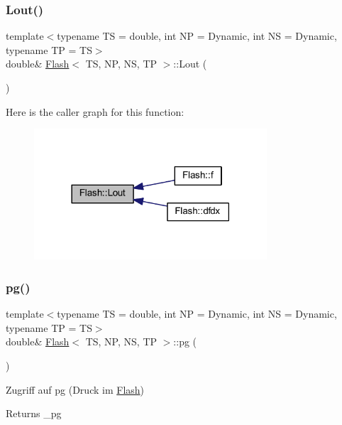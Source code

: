 \subsubsection{\texorpdfstring{Lout()}{Lout()}}
{\footnotesize\ttfamily template$<$typename TS = double, int NP = Dynamic, int NS = Dynamic, typename TP = TS$>$ \\
double\& \mbox{\hyperlink{class_flash}{Flash}}$<$ TS, NP, NS, TP $>$\+::Lout (\begin{DoxyParamCaption}{ }\end{DoxyParamCaption})\hspace{0.3cm}{\ttfamily [inline]}}

Here is the caller graph for this function\+:
\nopagebreak
\begin{figure}[H]
\begin{center}
\leavevmode
\includegraphics[width=246pt]{class_flash_a74418fb8dbfaf3f5e8f99d53393f6419_icgraph}
\end{center}
\end{figure}
\mbox{\label{class_flash_ac3cec3cdb03bd71e7b32d7e77a209308}} 
\subsubsection{\texorpdfstring{pg()}{pg()}}
{\footnotesize\ttfamily template$<$typename TS = double, int NP = Dynamic, int NS = Dynamic, typename TP = TS$>$ \\
double\& \mbox{\hyperlink{class_flash}{Flash}}$<$ TS, NP, NS, TP $>$\+::pg (\begin{DoxyParamCaption}{ }\end{DoxyParamCaption})\hspace{0.3cm}{\ttfamily [inline]}}



Zugriff auf pg (Druck im \mbox{\hyperlink{class_flash}{Flash}}) 

\begin{DoxyReturn}{Returns}
\+\_\+pg 
\end{DoxyReturn}
\mbox{\label{class_flash_ae54dbc3d5d7b87c854a765e9b5f4e519}} 
